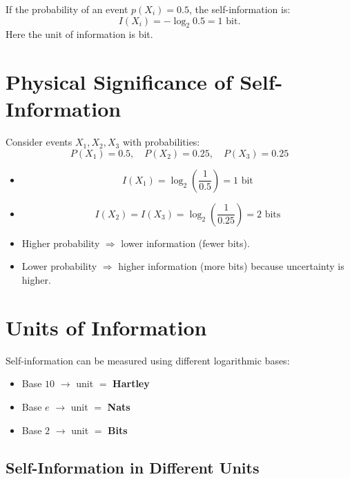 \documentclass[11pt,a4paper]{book}
\newcounter{qna}[chapter]
\renewcommand{\theqna}{\thechapter.\arabic{qna}}
\newenvironment{questionanswerbox}{
    \refstepcounter{qna}%
    \begin{tcolorbox}[
        enhanced,
        breakable,
        colback=softlavender!10,
        colframe=softlavender!200,
        title={Example~\theqna}, %
        fonttitle=\bfseries,
        coltitle=white,
        colbacktitle=softlavender!200,
        sharp corners,
        boxrule=1pt,
        left=8pt,
        right=8pt,
        top=6pt,
        bottom=6pt
    ]
}{
    \end{tcolorbox}
}
\begin{document}
\begin{questionanswerbox}
    If the probability of an event \( p(X_i) = 0.5 \), the self-information is:
    \[
        I(X_i) = - \log_2 0.5 = 1 \text{ bit}.
    \]
    Here the unit of information is bit.
\end{questionanswerbox}

\section{Physical Significance of Self-Information}

    Consider events \( X_1, X_2, X_3 \) with probabilities:
    \[
        P(X_1)=0.5,\quad P(X_2)=0.25,\quad P(X_3)=0.25
    \]

\begin{itemize}[label=$\rightarrow$]
    \item
          \[
              I(X_1)=\log_2\left(\frac{1}{0.5}\right)=1 \text{ bit}
          \]
    \item
          \[
              I(X_2)=I(X_3)=\log_2\left(\frac{1}{0.25}\right)=2 \text{ bits}
          \]
\end{itemize}

\begin{itemize}
    \item Higher probability $\Rightarrow$ lower information (fewer bits).
    \item Lower probability $\Rightarrow$ higher information (more bits) because uncertainty is higher.
\end{itemize}

\section{Units of Information}

Self-information can be measured using different logarithmic bases:

\begin{itemize}
    \item Base \(10\) $\rightarrow$ unit \(=\) \textbf{Hartley}
    \item Base \(e\) $\rightarrow$ unit \(=\) \textbf{Nats}
    \item Base \(2\) $\rightarrow$ unit \(=\) \textbf{Bits}
\end{itemize}

\subsection{Self-Information in Different Units}
\end{document}
